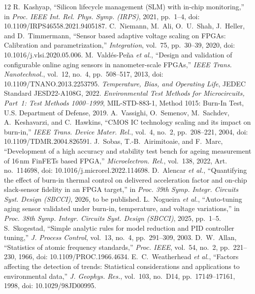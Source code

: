 \documentclass[10pt,twocolumn]{article}
\begin{document}
\renewcommand{\refname}{References}\begin{thebibliography}{12}
\footnotesize
{} R.~Kashyap, ``Silicon lifecycle management (SLM) with in-chip monitoring,'' in \emph{Proc. IEEE Int. Rel. Phys. Symp. (IRPS)}, 2021, pp.~1--4, doi: 10.1109/IRPS46558.2021.9405187.
 C.~Niemann, M.~Ali, O.~U.~Shah, J.~Heller, and D.~Timmermann, ``Sensor based adaptive voltage scaling on FPGAs: Calibration and parametrization,'' \emph{Integration}, vol.~75, pp.~30--39, 2020, doi: 10.1016/j.vlsi.2020.05.006.
 M.~Vald\'es-Pe\~na \emph{et al.}, ``Design and validation of configurable online aging sensors in nanometer-scale FPGAs,'' \emph{IEEE Trans. Nanotechnol.}, vol.~12, no.~4, pp.~508--517, 2013, doi: 10.1109/TNANO.2013.2253795.
 \emph{Temperature, Bias, and Operating Life}, JEDEC Standard JESD22-A108G, 2022.
 \emph{Environmental Test Methods for Microcircuits, Part~1: Test Methods 1000--1999}, MIL-STD-883-1, Method 1015: Burn-In Test, U.S. Department of Defense, 2019.
 A.~Vassighi, O.~Semenov, M.~Sachdev, A.~Keshavarzi, and C.~Hawkins, ``CMOS IC technology scaling and its impact on burn-in,'' \emph{IEEE Trans. Device Mater. Rel.}, vol.~4, no.~2, pp.~208--221, 2004, doi: 10.1109/TDMR.2004.826591.
 J.~Sobas, T.-B.~Airimitoaie, and F.~Marc, ``Development of a high accuracy and stability test bench for ageing measurement of 16\,nm FinFETs based FPGA,'' \emph{Microelectron. Rel.}, vol.~138, 2022, Art. no.~114698, doi: 10.1016/j.microrel.2022.114698.
 D.~Alencar \emph{et al.}, ``Quantifying the effect of burn-in thermal control on delivered acceleration factor and on-chip slack-sensor fidelity in an FPGA target,'' in \emph{Proc. 39th Symp. Integr. Circuits Syst. Design (SBCCI)}, 2026, to be published.
 L.~Nogueira \emph{et al.}, ``Auto-tuning aging sensor validated under burn-in, temperature, and voltage variations,'' in \emph{Proc. 38th Symp. Integr. Circuits Syst. Design (SBCCI)}, 2025, pp.~1--5.
 S.~Skogestad, ``Simple analytic rules for model reduction and PID controller tuning,'' \emph{J. Process Control}, vol.~13, no.~4, pp.~291--309, 2003.
 D.~W.~Allan, ``Statistics of atomic frequency standards,'' \emph{Proc. IEEE}, vol.~54, no.~2, pp.~221--230, 1966, doi: 10.1109/PROC.1966.4634.
 E.~C.~Weatherhead \emph{et al.}, ``Factors affecting the detection of trends: Statistical considerations and applications to environmental data,'' \emph{J. Geophys. Res.}, vol.~103, no.~D14, pp.~17149--17161, 1998, doi: 10.1029/98JD00995.
\end{thebibliography}
\end{document}
